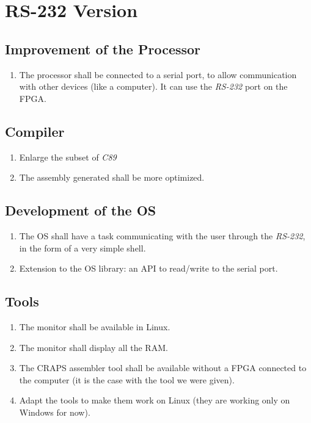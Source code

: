 \documentclass{article}
\begin{document}
    \section{RS-232 Version}

      \subsection{Improvement of the Processor}
        \begin{enumerate}
          \item The processor shall be connected to a serial port, to allow
            communication with other devices (like a computer). It can use the
            \textit{RS-232} port on the FPGA.
        \end{enumerate}

      \subsection{Compiler}
        \begin{enumerate}
          \item Enlarge the subset of \textit{C89}
          \item The assembly generated shall be more optimized.
        \end{enumerate}

      \subsection{Development of the OS}
        \begin{enumerate}
          \item The OS shall have a task communicating with the user through
            the \textit{RS-232}, in the form of a very simple shell.
          \item Extension to the OS library: an API to read/write to the serial
            port.
        \end{enumerate}
      \subsection{Tools}
        \begin{enumerate}
          \item The monitor shall be available in Linux.
          \item The monitor shall display all the RAM.
          \item The CRAPS assembler tool shall be available without a FPGA connected to the computer (it is the case with the tool we were given).
          \item Adapt the tools to make them work on Linux (they are working only on Windows for now).
        \end{enumerate}
\end{document}
